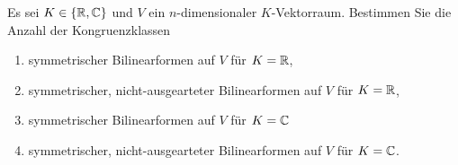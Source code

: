 \documentclass[a4paper, 10pt]{scrartcl}
\begin{document}
\begin{question}[subtitle = Anzahl von Kongruenzklassen]
  Es sei $K \in \{ \mathbb{R}, \mathbb{C}\}$ und $V$ ein $n$-dimensionaler $K$-Vektorraum.
  Bestimmen Sie die Anzahl der Kongruenzklassen
  \begin{enumerate}
    \item
      symmetrischer Bilinearformen auf $V$ für $K = \mathbb{R}$,
    \item
      symmetrischer, nicht-ausgearteter Bilinearformen auf $V$ für $K = \mathbb{R}$,
    \item
      symmetrischer Bilinearformen auf $V$ für $K = \mathbb{C}$
    \item
      symmetrischer, nicht-ausgearteter Bilinearformen auf $V$ für $K = \mathbb{C}$.
  \end{enumerate}
\end{question}
\end{document}
